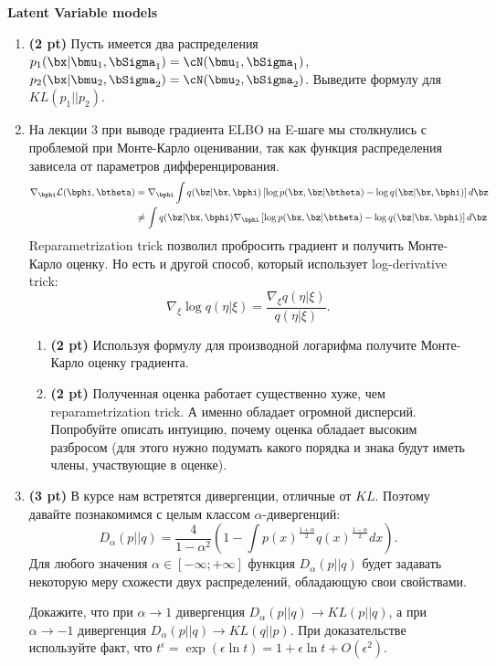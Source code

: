 \documentclass{article}
\begin{document}
{\large \textbf{Latent Variable models}}
\begin{enumerate}
	\item \textbf{(2 pt)} Пусть имеется два распределения $p_1(\bx | \bmu_1, \bSigma_1) = \cN(\bmu_1, \bSigma_1)$, $p_2(\bx | \bmu_2, \bSigma_2) = \cN(\bmu_2, \bSigma_2)$. Выведите формулу для $KL(p_1 || p_2)$.
	\item На лекции 3 при выводе градиента ELBO на E-шаге мы столкнулись с проблемой при Монте-Карло оценивании, так как функция распределения зависела от параметров дифференцирования.
		\begin{align*}
			\nabla_{\bphi} \mathcal{L} (\bphi, \btheta) &= \nabla_{\bphi} \int q(\bz | \bx, \bphi) \left[\log p(\bx, \bz | \btheta) - \log q(\bz| \bx, \bphi) \right] d \bz \\
			& \neq  \int q(\bz | \bx, \bphi) \nabla_{\bphi} \left[\log p(\bx, \bz | \btheta) - \log q(\bz| \bx, \bphi) \right] d \bz \\
		\end{align*}
	 Reparametrization trick позволил пробросить градиент и получить Монте-Карло оценку. Но есть и другой способ, который использует log-derivative trick:
	 \[
	 	  \nabla_\xi  \log q(\eta| \xi) = \frac{\nabla_\xi q(\eta| \xi)}{q(\eta| \xi)}.
	 \] 
	 \begin{enumerate}
	 \item \textbf{(2 pt)} Используя формулу для производной логарифма получите Монте-Карло оценку градиента.
	 \item \textbf{(2 pt)} Полученная оценка работает существенно хуже, чем reparametrization trick. А именно обладает огромной дисперсий. Попробуйте описать интуицию, почему оценка обладает высоким разбросом (для этого нужно подумать какого порядка и знака будут иметь члены, участвующие в оценке).
	 \end{enumerate}
	 
	  \item \textbf{(3 pt)} В курсе нам встретятся дивергенции, отличные от $KL$. Поэтому давайте познакомимся с целым классом $\alpha$-дивергенций:
	  \[
	 	  	D_{\alpha}(p || q) = \frac{4}{1 - \alpha^2} \left( 1 - \int p(x)^{\frac{1 + \alpha}{2}}q(x)^{\frac{1 - \alpha}{2}}dx\right).
	  \]
	  Для любого значения $\alpha \in [-\infty; +\infty]$ функция $D_{\alpha} (p || q)$ будет задавать некоторую меру схожести двух распределений, обладающую свои свойствами.
	  
	  Докажите, что при $\alpha \rightarrow 1$ дивергенция $D_{\alpha}(p || q) \rightarrow KL(p || q)$, а при $\alpha \rightarrow -1$ дивергенция $D_{\alpha}(p || q) \rightarrow KL(q || p)$. При доказательстве используйте факт, что $t^\epsilon = \exp(\epsilon \ln t) = 1 + \epsilon \ln t + O(\epsilon^2)$.
\end{enumerate}
\end{document}
